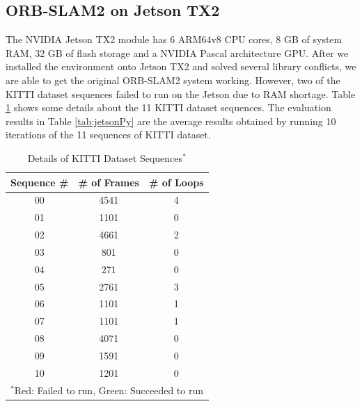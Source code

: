\documentclass[letterpaper, 10 pt, conference]{IEEEtran}
\begin{document}
\subsection{ORB-SLAM2 on Jetson TX2} \label{sect:\thesubsection}
The NVIDIA Jetson TX2 module has 6 ARM64v8 CPU cores, 8 GB of system RAM, 32 GB
of flash storage and a NVIDIA Pascal architecture GPU. After we installed the
environment onto Jetson TX2 and solved several library conflicts, we are able to
get the original ORB-SLAM2 system working. However, two of the KITTI dataset
sequences failed to run on the Jetson due to RAM shortage. Table
\ref{tab:jetson} shows some details about the 11 KITTI dataset sequences. The
evaluation results in Table \ref{tab:jetsonPy} are the average results obtained
by running 10 iterations of the 11 sequences of KITTI dataset. 

\begin{table}[htbp]
\caption{Details of KITTI Dataset Sequences$^{\mathrm{*}}$}
\begin{center}
\begin{tabular}{|c|c|c|}
\hline
\textbf{Sequence \#} & \textbf{\# of Frames} & \textbf{\# of Loops} \\
\hline\hline
\color{red}00 & \color{red}4541 & \color{red}4 \\
\hline
\color{ForestGreen}01 & \color{ForestGreen}1101 & \color{ForestGreen}0 \\
\hline
\color{red}02 & \color{red}4661 & \color{red}2 \\
\hline
\color{ForestGreen}03 & \color{ForestGreen}801 & \color{ForestGreen}0 \\
\hline
\color{ForestGreen}04 & \color{ForestGreen}271 & \color{ForestGreen}0 \\
\hline
\color{ForestGreen}05 & \color{ForestGreen}2761 & \color{ForestGreen}3 \\
\hline
\color{ForestGreen}06 & \color{ForestGreen}1101 & \color{ForestGreen}1 \\
\hline
\color{ForestGreen}07 & \color{ForestGreen}1101 & \color{ForestGreen}1 \\
\hline
\color{ForestGreen}08 & \color{ForestGreen}4071 & \color{ForestGreen}0 \\
\hline
\color{ForestGreen}09 & \color{ForestGreen}1591 & \color{ForestGreen}0 \\
\hline
\color{ForestGreen}10 & \color{ForestGreen}1201 & \color{ForestGreen}0 \\
\hline
\multicolumn{3}{l}{$^{\mathrm{*}}${\color{red}Red: Failed to run}, {\color{ForestGreen}Green: Succeeded to run}}
\end{tabular}
\label{tab:jetson}
\end{center}
\end{table}
\end{document}
